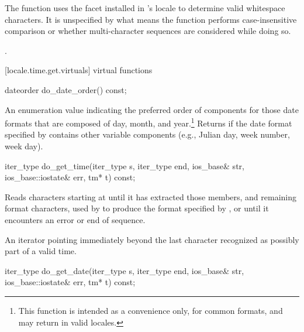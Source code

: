 \begin{itemdescr}
\pnum
\begin{note} The function uses the 
facet installed in 's locale
to determine valid whitespace characters. It is unspecified by what
means the function performs case-insensitive comparison or whether
multi-character sequences are considered while doing so. \end{note}

\pnum
\returns {}.
\end{itemdescr}

[locale.time.get.virtuals]{ virtual functions}

%
\begin{itemdecl}
dateorder do_date_order() const;
\end{itemdecl}

\begin{itemdescr}
\pnum
\returns
An enumeration value indicating the preferred order of components for
those date formats that are composed of day, month, and year.\footnote{This
function is intended as a convenience only, for common
formats, and may return
in valid locales.}
Returns
if the date format specified by
contains other variable components (e.g., Julian day, week number, week day).
\end{itemdescr}

%
\begin{itemdecl}
iter_type do_get_time(iter_type s, iter_type end, ios_base& str,
                      ios_base::iostate& err, tm* t) const;
\end{itemdecl}

\begin{itemdescr}
\pnum
\effects
Reads characters starting at 
until it has extracted those
members, and remaining format characters, used by
to produce the format specified by
,
or until it encounters an error or end of sequence.

\pnum
\returns
An iterator pointing immediately beyond the last character recognized
as possibly part of a valid time.
\end{itemdescr}

%
\begin{itemdecl}
iter_type do_get_date(iter_type s, iter_type end, ios_base& str,
                      ios_base::iostate& err, tm* t) const;
\end{itemdecl}

